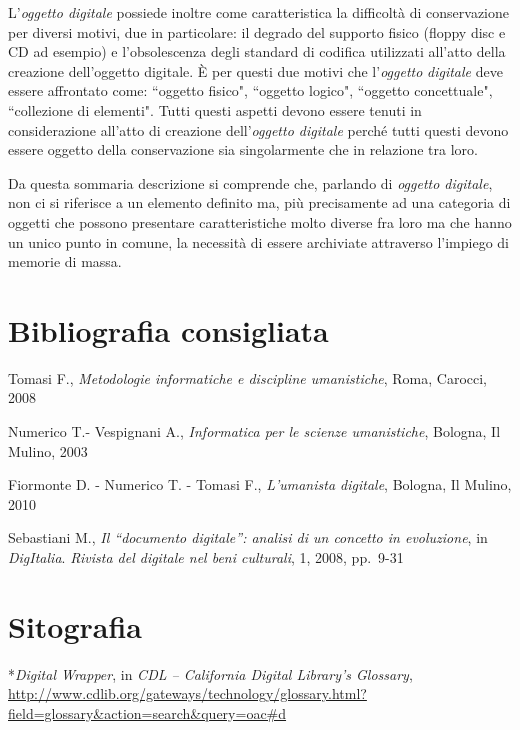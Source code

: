 \documentclass[
  b5paper,
  twoside,
  12pt,
  chapterprefix=false,
  bibliography=totocnumbered,
  parskip=false]{scrbook}
\begin{document}
L'\emph{oggetto digitale} possiede inoltre come caratteristica la difficoltà
di conservazione per diversi motivi, due in particolare: il degrado del
supporto fisico (floppy disc e CD ad esempio) e l'obsolescenza degli
standard di codifica utilizzati all'atto della creazione dell'oggetto
digitale. È per questi due motivi che l'\emph{oggetto} \emph{digitale} deve essere
affrontato come: ``oggetto fisico", ``oggetto logico", ``oggetto concettuale", ``collezione di elementi". Tutti questi aspetti devono
essere tenuti in considerazione all'atto di creazione dell'\emph{oggetto
digitale} perché tutti questi devono essere oggetto della conservazione
sia singolarmente che in relazione tra loro.

Da questa sommaria descrizione si comprende che, parlando di \emph{oggetto
digitale}, non ci si riferisce a un elemento definito ma, più
precisamente ad una categoria di oggetti che possono presentare
caratteristiche molto diverse fra loro ma che hanno un unico punto in
comune, la necessità di essere archiviate attraverso l'impiego di
memorie di massa.

\hypertarget{bibliografia-consigliata-17}{%
\section*{Bibliografia consigliata}\label{bibliografia-consigliata-17}}

Tomasi F., \emph{Metodologie informatiche e discipline umanistiche}, Roma,
Carocci, 2008

Numerico T.- Vespignani A., \emph{Informatica per le scienze umanistiche},
Bologna, Il Mulino, 2003

Fiormonte D. - Numerico T. - Tomasi F., \emph{L'umanista digitale}, Bologna,
Il Mulino, 2010

Sebastiani M., \emph{Il \enquote{documento digitale}: analisi di un concetto in
evoluzione}, in \emph{DigItalia}. \emph{Rivista del digitale nel beni culturali},
1, 2008, pp.~9-31

\hypertarget{sitografia-24}{%
\section*{Sitografia}\label{sitografia-24}}

*\emph{Digital Wrapper}, in \emph{CDL -- California Digital Library's Glossary},
\url{http://www.cdlib.org/gateways/technology/glossary.html?field=glossary\&action=search\&query=oac\#d}
\end{document}
